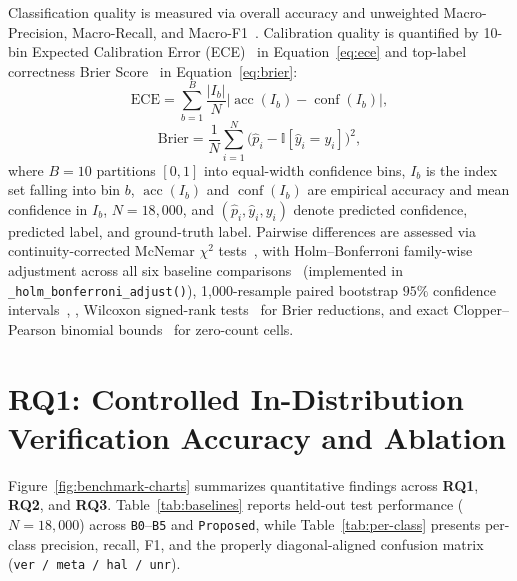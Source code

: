 Classification quality is measured via overall accuracy and unweighted Macro-Precision, Macro-Recall, and Macro-F1~\cite{Chawla2009}. Calibration quality is quantified by 10-bin Expected Calibration Error (ECE)~\cite{guo2017} in Equation~\eqref{eq:ece} and top-label correctness Brier Score~\cite{brier1950} in Equation~\eqref{eq:brier}:
\begin{equation}\label{eq:ece}
\text{ECE} = \sum_{b=1}^{B} \frac{|I_b|}{N} \bigl|\operatorname{acc}(I_b) - \operatorname{conf}(I_b)\bigr|,
\end{equation}
\begin{equation}\label{eq:brier}
\text{Brier} = \frac{1}{N} \sum_{i=1}^{N} \bigl(\hat{p}_i - \mathbb{I}[\hat{y}_i = y_i]\bigr)^2,
\end{equation}
where $B = 10$ partitions $[0, 1]$ into equal-width confidence bins, $I_b$ is the index set falling into bin $b$, $\operatorname{acc}(I_b)$ and $\operatorname{conf}(I_b)$ are empirical accuracy and mean confidence in $I_b$, $N = 18{,}000$, and $(\hat{p}_i, \hat{y}_i, y_i)$ denote predicted confidence, predicted label, and ground-truth label. Pairwise differences are assessed via continuity-corrected McNemar $\chi^2$ tests~\cite{mcnemar1947}, \cite{dietterich1998approximate} with Holm--Bonferroni family-wise adjustment across all six baseline comparisons~\cite{holm1979simple} (implemented in \texttt{\_holm\_bonferroni\_adjust()}), 1,000-resample paired bootstrap $95\%$ confidence intervals~\cite{bergkirkpatrick2012empirical}, \cite{dror2018hitchhiker}, Wilcoxon signed-rank tests~\cite{wilcoxon1945} for Brier reductions, and exact Clopper--Pearson binomial bounds~\cite{clopper1934} for zero-count cells.

\section{RQ1: Controlled In-Distribution Verification Accuracy and Ablation}

Figure~\ref{fig:benchmark-charts} summarizes quantitative findings across \textbf{RQ1}, \textbf{RQ2}, and \textbf{RQ3}. Table~\ref{tab:baselines} reports held-out test performance ($N = 18{,}000$) across \texttt{B0}--\texttt{B5} and \texttt{Proposed}, while Table~\ref{tab:per-class} presents per-class precision, recall, F1, and the properly diagonal-aligned confusion matrix (\texttt{ver / meta / hal / unr}).

